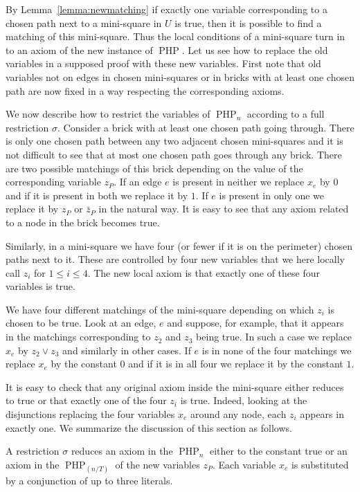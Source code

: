 \documentclass{article}\usepackage[a4paper,margin=20mm]{geometry}
\DeclareMathOperator{\PHP}{PHP}
\begin{document}
By Lemma~\ref{lemma:newmatching} if exactly one
variable corresponding to a chosen path next to a mini-square in $U$ is true,
then it is possible to find a matching of this mini-square.
Thus the local conditions of a mini-square turn in to
an axiom of the new instance of $\PHP$.
Let us see how to replace the old variables
in a supposed proof with these new variables.
First note that old variables not on edges in chosen mini-squares
or in bricks with at least one chosen path
are now fixed in a way respecting the corresponding
axioms.

We now describe how to restrict the variables of $\PHP_n$
according to a full restriction $\sigma$.
Consider a brick with at least one chosen path
going through.  There is only one chosen path
between any two adjacent chosen mini-squares and it is not difficult to
see that at
most one chosen path goes through any brick.
There are two possible matchings of this brick
depending on the value of the corresponding
variable $z_P$.  If an edge $e$ is present in
neither we replace $x_e$ by $0$ and if it is
present in both we replace it by $1$.
If $e$ is present in only one we replace it
by $z_P$ or $\bar z_P$ in the natural way.
It is easy to see that any axiom
related to a node in the brick becomes
true.

Similarly, in a mini-square we have
four (or fewer if it is on the perimeter) chosen
paths next to it. These are controlled by four
new variables that we here locally call
$z_i$ for $1 \leq i \leq 4$.  The new local
axiom is that exactly one of these four
variables is true.

We have four different matchings of the mini-square
depending on which $z_i$ is chosen to be true.
Look at an edge, $e$ and suppose, for example, that it appears 
in the matchings corresponding to $z_2$ and $z_3$
being true.  In such a case we replace $x_e$ by $z_2 \lor z_3$ and
similarly in other cases.  If $e$ is in none of the
four matchings we replace $x_e$ by the constant $0$ and
if it is in all four we replace it by
the constant $1$.

It is easy to check that any original axiom inside
the mini-square either reduces to true or that
exactly one of the four $z_i$ is true.
Indeed, looking at the disjunctions replacing
the four variables $x_e$ around any node, each $z_i$ appears
in exactly one.  We summarize the discussion of
this section as follows.
\begin{lemma}\label{lemma:reduced}
A restriction $\sigma$ reduces an axiom in the 
$\PHP_n$ either
to the constant true or an axiom in the $\PHP_{(n/T)}$ of
the new variables $z_P$.
Each variable $x_e$ is substituted by a conjunction
of up to three literals.
\end{lemma}
\end{document}
